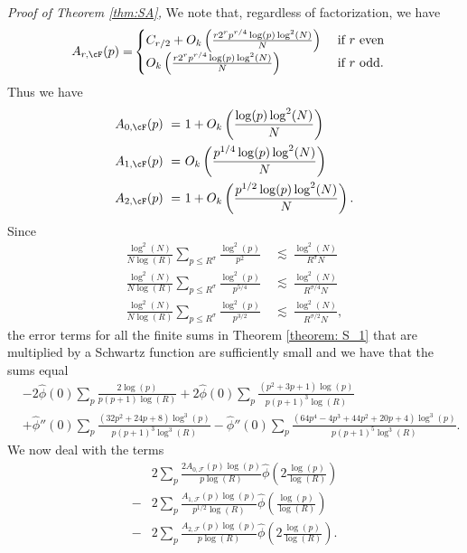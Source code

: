 \documentclass[11pt, reqno]{amsart}
\theoremstyle{definition}
\theoremstyle{remark}
\numberwithin{equation}{section}
\renewcommand{\hat}{\widehat}
\begin{document}
\noindent \textit{Proof of Theorem \ref{thm:SA},}
 We note that, regardless of factorization, we have
\begin{align}
    A_{r,\cF}(p)=& 
\begin{cases}
        C_{r/2} + O_k\left(\frac{r2^rp^{r/4}\log(p)\log^2(N)}{N}\right) &\text{ if $r$ even}\\
        O_k\left(\frac{r2^rp^{r/4}\log(p)\log^2(N)}{N}\right)&\text{ if $r$ odd}.
        \end{cases}
\end{align}
Thus we have 
\begin{align}
    A_{0,\cF}(p)\ =& \ 1+O_k\left(\frac{\log(p)\log^2(N)}{N}\right)\nonumber\\
    A_{1,\cF}(p)\ =& \ O_k\left(\frac{p^{1/4}\log(p)\log^2(N)}{N}\right)\nonumber\\
    A_{2,\cF}(p)\ =& \ 1 +O_k\left(\frac{p^{1/2}\log(p)\log^2(N)}{N}\right).
\end{align}
Since 
\begin{align*}
    \frac{\log^2(N)}{N \log(R)}\sum_{p\leq R^{\sigma}} \frac{\log^2(p)}{p^2 } &\ \lesssim\ \frac{\log^2(N)}{R^{\sigma}N}\\
     \frac{\log^2(N)}{N \log(R)}\sum_{p\leq R^{\sigma}} \frac{\log^2(p)}{p^{5/4} }&\ \lesssim\ \frac{\log^2(N)}{R^{\sigma/4}N} \\
     \frac{\log^2(N)}{N \log(R)}\sum_{p\leq R^{\sigma}} \frac{\log^2(p)}{p^{3/2} } &\ \lesssim\ \frac{\log^2(N)}{R^{\sigma/2}N},
\end{align*}
the error terms for all the finite sums in Theorem \eqref{theorem: S_1} that are multiplied by a Schwartz function are sufficiently small and we have that the sums equal
\begin{align*}
&-2\hat{\phi}\left(0 \right)\sum_p\frac{2\log(p)}{p(p+1)\log(R)}+2\hat{\phi}\left(0 \right) \sum_p\frac{(p^2+3p+1)\log(p)}{p(p+1)^3 \log(R)} \\ 
&+\hat{\phi}''(0)\sum_p\frac{(32p^2+24p+8)\log^3(p)}{p(p+1)^3\log^3(R)} -\hat{\phi}''(0)\sum_p\frac{(64p^4-4p^3+44p^2+20p+4)\log^3(p)}{p(p+1)^5\log^3(R)}.
\end{align*}
We now deal with the terms
\begin{align*}
&2\sum_p
\frac{2A_{0, \mathcal{F}}(p)\log(p)}{p\log(R)}\hat{\phi}\left(2 \frac{\log(p)}{\log(R)} \right) \\
-&2\sum_p\frac{A_{1, \mathcal{F}}(p)\log(p)}{p^{1/2}\log(R)}\hat{\phi}\left(\frac{\log(p)}{\log(R)} \right)\\
-&2\sum_p\frac{A_{2,\mathcal{F}}(p)\log(p)}{p\log(R)}\hat{\phi}\left(2 \frac{\log(p)}{\log(R)} \right).
\end{align*}
\end{document}
